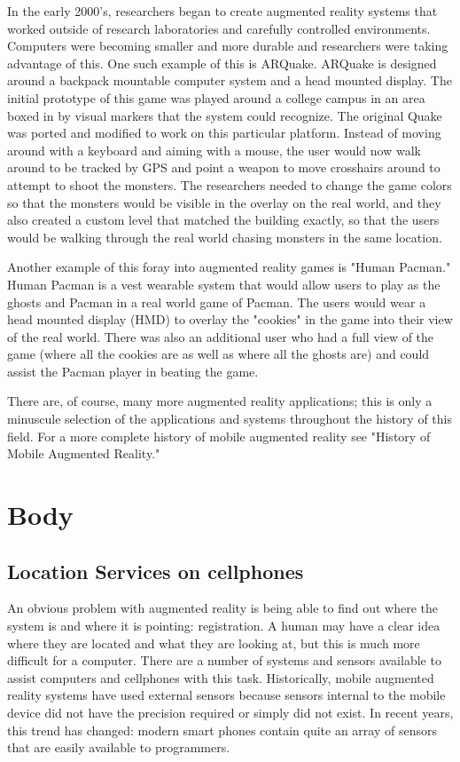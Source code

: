 \documentclass{acm_proc_article-sp}
\begin{document}
In the early 2000's, researchers began to create augmented reality systems that worked outside of research laboratories and carefully controlled environments.  Computers were becoming smaller and more durable and researchers were taking advantage of this. One such example of this is ARQuake.  ARQuake is designed around a backpack mountable computer system and a head mounted display.  The initial prototype of this game was played around a college campus in an area boxed in by visual markers that the system could recognize. The original Quake was ported and modified to work on this particular platform.  Instead of moving around with a keyboard and aiming with a mouse, the user would now walk around to be tracked by GPS and point a weapon to move crosshairs around to attempt to shoot the monsters.  The researchers needed to change the game colors so that the monsters would be visible in the overlay on the real world, and they also created a custom level that matched the building exactly, so that the users would be walking through the real world chasing monsters in the same location.  \cite{thomas2000arquake}

Another example of this foray into augmented reality games is "Human Pacman."  Human Pacman is a vest wearable system that would allow users to play as the ghosts and Pacman in a real world game of Pacman.  The users would wear a head mounted display (HMD) to overlay the "cookies" in the game into their view of the real world.  There was also an additional user who had a full view of the game (where all the cookies are as well as where all the ghosts are) and could assist the Pacman player in beating the game.  \cite{cheok2004human}

There are, of course, many more augmented reality applications; this is only a minuscule selection of the applications and systems throughout the history of this field.  For a more complete history of mobile augmented reality see "History of Mobile Augmented Reality." \cite{hist.ar}

\section{Body}
\subsection{Location Services on cellphones}

An obvious problem with augmented reality is being able to find out where the system is and where it is pointing: registration.  A human may have a clear idea where they are located and what they are looking at, but this is much more difficult for a computer. \cite{szeliski2010computer}  There are a number of systems and sensors available to assist computers and cellphones with this task.  
Historically, mobile augmented reality systems have used external sensors because sensors internal to the mobile device did not have the precision required or simply did not exist.  In recent years, this trend has changed:  modern smart phones contain quite an array of sensors that are easily available to programmers.  
\end{document}
